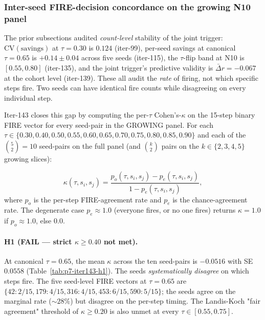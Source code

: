 
\subsubsection{Inter-seed FIRE-decision concordance on the growing N10 panel}
\label{sec:p7-iter143-decision-concordance}

The prior subsections audited \emph{count-level} stability of the joint
trigger: $\mathrm{CV}(\mathrm{savings})$ at $\tau=0.30$ is $0.124$
(iter-99), per-seed savings at canonical $\tau=0.65$ is $+0.14 \pm 0.04$
across five seeds (iter-115), the $\tau$-flip band at N10 is
$[0.55, 0.80]$ (iter-135), and the joint trigger's predictive validity
is $\bar\Delta r = -0.067$ at the cohort level (iter-139). These all
audit the \emph{rate} of firing, not which specific steps fire. Two
seeds can have identical fire counts while disagreeing on every
individual step.

Iter-143 closes this gap by computing the per-$\tau$ Cohen's-$\kappa$
on the 15-step binary FIRE vector for every seed-pair in the
GROWING panel. For each $\tau \in \{0.30, 0.40, 0.50, 0.55, 0.60,
0.65, 0.70, 0.75, 0.80, 0.85, 0.90\}$ and each of the $\binom{5}{2}=10$
seed-pairs on the full panel (and $\binom{k}{2}$ pairs on the
$k \in \{2,3,4,5\}$ growing slices):

\[
\kappa(\tau, s_i, s_j)
= \frac{p_o(\tau, s_i, s_j) - p_e(\tau, s_i, s_j)}
       {1 - p_e(\tau, s_i, s_j)},
\]
where $p_o$ is the per-step FIRE-agreement rate and $p_e$ is the
chance-agreement rate. The degenerate case $p_e \approx 1.0$
(everyone fires, or no one fires) returns $\kappa = 1.0$ if
$p_o \approx 1.0$, else $0.0$.

\paragraph{H1 (FAIL --- strict $\kappa \geq 0.40$ not met).}
At canonical $\tau=0.65$, the mean $\kappa$ across the ten seed-pairs
is $-0.0516$ with SE $0.0558$ (Table~\ref{tab:p7-iter143-h1}). The
seeds \emph{systematically disagree} on which steps fire. The
five seed-level FIRE vectors at $\tau=0.65$ are
$\{42: 2/15, 179: 4/15, 316: 4/15, 453: 6/15, 590: 5/15\}$; the seeds
agree on the marginal rate ($\sim 28\%$) but disagree on the per-step
timing. The Landis-Koch "fair agreement" threshold of $\kappa \geq 0.20$
is also unmet at every $\tau \in [0.55, 0.75]$.

